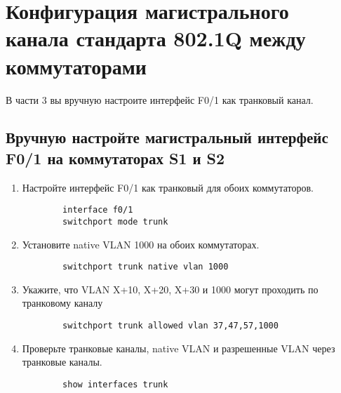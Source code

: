 \section{Конфигурация магистрального канала стандарта 802.1Q между коммутаторами}
В части 3 вы вручную настроите интерфейс F0/1 как транковый канал.

\subsection{Вручную настройте магистральный интерфейс F0/1 на коммутаторах S1 и S2}
\begin{enumerate}[a]
    \item Настройте интерфейс F0/1 как транковый для обоих коммутаторов.
    \begin{verbatim}
        interface f0/1
        switchport mode trunk
    \end{verbatim}

    \item Установите native VLAN 1000 на обоих коммутаторах.
    \begin{verbatim}
        switchport trunk native vlan 1000
    \end{verbatim}

    \item Укажите, что VLAN X+10, X+20, X+30 и 1000 могут проходить по транковому каналу
    \begin{verbatim}
        switchport trunk allowed vlan 37,47,57,1000
    \end{verbatim}

    \item Проверьте транковые каналы, native VLAN и разрешенные VLAN через транковые каналы.
    \begin{verbatim}
        show interfaces trunk
    \end{verbatim}
\end{enumerate}


